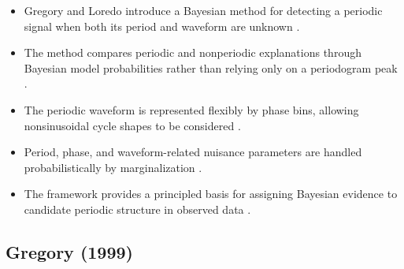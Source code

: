 \documentclass[a4paper]{article}
\begin{document}
\begin{itemize}

    \item Gregory and Loredo introduce a Bayesian method for detecting a periodic signal when both its period and waveform are unknown \citep{gregory-1992-a-new-method-for-the-detection-of-a-periodic-signal-of-unknown-shape-and-period}.

    \item The method compares periodic and nonperiodic explanations through Bayesian model probabilities rather than relying only on a periodogram peak \citep{gregory-1992-a-new-method-for-the-detection-of-a-periodic-signal-of-unknown-shape-and-period}.

    \item The periodic waveform is represented flexibly by phase bins, allowing nonsinusoidal cycle shapes to be considered \citep{gregory-1992-a-new-method-for-the-detection-of-a-periodic-signal-of-unknown-shape-and-period}.

    \item Period, phase, and waveform-related nuisance parameters are handled probabilistically by marginalization \citep{gregory-1992-a-new-method-for-the-detection-of-a-periodic-signal-of-unknown-shape-and-period}.

    \item The framework provides a principled basis for assigning Bayesian evidence to candidate periodic structure in observed data \citep{gregory-1992-a-new-method-for-the-detection-of-a-periodic-signal-of-unknown-shape-and-period}.

\end{itemize}

\subsection{Gregory (1999)}
\end{document}

